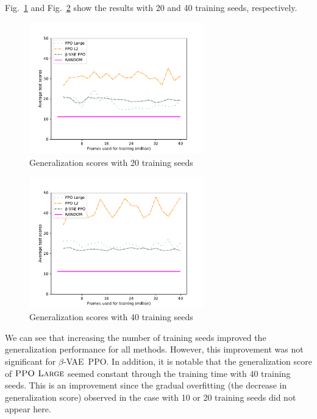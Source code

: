 \documentclass[conference]{IEEEtran}
\newcommand\ppol{$\textsc{PPO Large}$}
\newcommand\bvae{$\beta$-VAE}
\newcommand\bppo{\bvae~PPO}
\begin{document}
Fig.~\ref{seed20-e} and Fig.~\ref{seed40-e} show the results with 20
and 40 training seeds, respectively.
\begin{figure}[t]
 \centering
 \includegraphics[width=7.6cm]{pictures/escore20.pdf}
 \caption{Generalization scores with 20 training seeds} \label{seed20-e}
\end{figure}
\begin{figure}[t]
 \centering
 \includegraphics[width=7.6cm]{pictures/escore40.pdf}
 \caption{Generalization scores with 40 training seeds} \label{seed40-e}
\end{figure}
We can see that increasing the number of training seeds improved the
generalization performance for all methods.
However, this improvement was not significant for \bppo{}.
In addition, it is notable that the generalization score of \ppol{}
seemed constant through the training time with 40 training seeds.
This is an improvement since the gradual overfitting
(the decrease in generalization score) observed in the case with 10 or
20 training seeds did not appear here.
\end{document}
